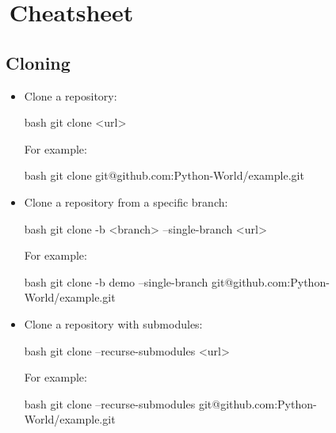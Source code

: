 \section{\,Cheatsheet}


\subsection{Cloning}

\begin{itemize}
    \item Clone a repository:
    \begin{mintedbox}{bash}
git clone <url>
    \end{mintedbox}
    For example:
    \begin{mintedbox}{bash}
git clone git@github.com:Python-World/example.git
    \end{mintedbox}
    \item Clone a repository from a specific branch:
    \begin{mintedbox}{bash}
git clone -b <branch> --single-branch <url>
    \end{mintedbox}
    For example:
    \begin{mintedbox}{bash}
git clone -b demo --single-branch git@github.com:Python-World/example.git
    \end{mintedbox}
    \item Clone a repository with submodules:
    \begin{mintedbox}{bash}
git clone --recurse-submodules <url>
    \end{mintedbox}
    For example:
    \begin{mintedbox}{bash}
git clone --recurse-submodules git@github.com:Python-World/example.git
    \end{mintedbox}
\end{itemize}


